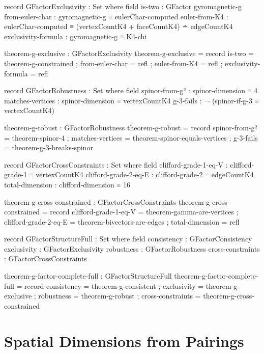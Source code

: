 \documentclass[11pt,a4paper]{book}
\begin{document}
\begin{code}
record GFactorExclusivity : Set where
  field
    is-two              : GFactor gyromagnetic-g
    from-euler-char     : gyromagnetic-g ≡ eulerChar-computed
    euler-from-K4       : eulerChar-computed ≡ (vertexCountK4 + faceCountK4) ∸ edgeCountK4
    exclusivity-formula : gyromagnetic-g ≡ K4-chi

theorem-g-exclusive : GFactorExclusivity
theorem-g-exclusive = record
  { is-two = theorem-g-constrained
  ; from-euler-char = refl
  ; euler-from-K4 = refl
  ; exclusivity-formula = refl
  }

record GFactorRobustness : Set where
  field
    spinor-from-g²   : spinor-dimension ≡ 4
    matches-vertices : spinor-dimension ≡ vertexCountK4
    g-3-fails        : ¬ (spinor-if-g-3 ≡ vertexCountK4)

theorem-g-robust : GFactorRobustness
theorem-g-robust = record
  { spinor-from-g² = theorem-spinor-4
  ; matches-vertices = theorem-spinor-equals-vertices
  ; g-3-fails = theorem-g-3-breaks-spinor
  }

record GFactorCrossConstraints : Set where
  field
    clifford-grade-1-eq-V : clifford-grade-1 ≡ vertexCountK4
    clifford-grade-2-eq-E : clifford-grade-2 ≡ edgeCountK4
    total-dimension       : clifford-dimension ≡ 16

theorem-g-cross-constrained : GFactorCrossConstraints
theorem-g-cross-constrained = record
  { clifford-grade-1-eq-V = theorem-gamma-are-vertices
  ; clifford-grade-2-eq-E = theorem-bivectors-are-edges
  ; total-dimension = refl
  }
\end{code}

\begin{code}
record GFactorStructureFull : Set where
  field
    consistency      : GFactorConsistency
    exclusivity      : GFactorExclusivity
    robustness       : GFactorRobustness
    cross-constraints : GFactorCrossConstraints

theorem-g-factor-complete-full : GFactorStructureFull
theorem-g-factor-complete-full = record
  { consistency = theorem-g-consistent
  ; exclusivity = theorem-g-exclusive
  ; robustness = theorem-g-robust
  ; cross-constraints = theorem-g-cross-constrained
  }
\end{code}

\section{Spatial Dimensions from Pairings}
\end{document}
